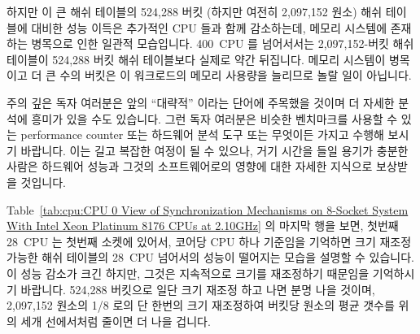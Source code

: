 {	\fi

	하지만 이 큰 해쉬 테이블의 524,288 버킷 (하지만 여전히 2,097,152 원소)
	해쉬 테이블에 대비한 성능 이득은 추가적인 CPU 들과 함께 감소하는데,
	메모리 시스템에 존재하는 병목으로 인한 일관적 모습입니다.
	400~CPU 를 넘어서서는 2,097,152-버킷 해쉬 테이블이 524,288 버킷 해쉬
	테이블보다 실제로 약간 뒤집니다.
	메모리 시스템이 병목이고 더 큰 수의 버킷은 이 워크로드의 메모리
	사용량을 늘리므로 놀랄 일이 아닙니다.

	주의 깊은 독자 여러분은 앞의 ``대략적'' 이라는 단어에 주목했을 것이며
	더 자세한 분석에 흥미가 있을 수도 있습니다.
	그런 독자 여러분은 비슷한 벤치마크를 사용할 수 있는 performance counter
	또는 하드웨어 분석 도구 또는 무엇이든 가지고 수행해 보시기 바랍니다.
	이는 길고 복잡한 여정이 될 수 있으나, 거기 시간을 들일 용기가 충분한
	사람은 하드웨어 성능과 그것의 소프트웨어로의 영향에 대한 자세한
	지식으로 보상받을 것입니다.

}\QuickQuizEnd

Table~\ref{tab:cpu:CPU 0 View of Synchronization Mechanisms on 8-Socket System With Intel Xeon Platinum 8176 CPUs at 2.10GHz}
의 마지막 행을 보면, 첫번째 28~CPU 는 첫번째 소켓에 있어서, 코어당 CPU 하나
기준임을 기억하면 크기 재조정 가능한 해쉬 테이블의 28~CPU 넘어서의 성능이
떨어지는 모습을 설명할 수 있습니다.
이 성능 감소가 크긴 하지만, 그것은 지속적으로 크기를 재조정하기 때문임을
기억하시기 바랍니다.
524,288 버킷으로 일단 크기 재조정 하고 나면 분명 나을 것이며, 2,097,152 원소의
1/8 로의 단 한번의 크기 재조정하여 버킷당 원소의 평균 갯수를 위의 세개
선에서처럼 줄이면 더 나을 겁니다.


